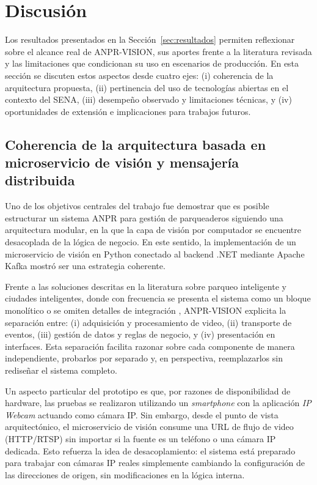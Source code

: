 \section{Discusión}
\label{sec:discusion}

Los resultados presentados en la Sección~\ref{sec:resultados} permiten reflexionar sobre el alcance real de ANPR-VISION, sus aportes frente a la literatura revisada y las limitaciones que condicionan su uso en escenarios de producción. En esta sección se discuten estos aspectos desde cuatro ejes: (i) coherencia de la arquitectura propuesta, (ii) pertinencia del uso de tecnologías abiertas en el contexto del SENA, (iii) desempeño observado y limitaciones técnicas, y (iv) oportunidades de extensión e implicaciones para trabajos futuros.

\subsection{Coherencia de la arquitectura basada en microservicio de visión y mensajería distribuida}

Uno de los objetivos centrales del trabajo fue demostrar que es posible estructurar un sistema ANPR para gestión de parqueaderos siguiendo una arquitectura modular, en la que la capa de visión por computador se encuentre desacoplada de la lógica de negocio. En este sentido, la implementación de un microservicio de visión en Python conectado al backend .NET mediante Apache Kafka mostró ser una estrategia coherente.

Frente a las soluciones descritas en la literatura sobre parqueo inteligente y ciudades inteligentes, donde con frecuencia se presenta el sistema como un bloque monolítico o se omiten detalles de integración \cite{streetsavvy_2024,campussense_2017,realtime_parking_two_cameras_2024}, ANPR-VISION explicita la separación entre: (i) adquisición y procesamiento de video, (ii) transporte de eventos, (iii) gestión de datos y reglas de negocio, y (iv) presentación en interfaces. Esta separación facilita razonar sobre cada componente de manera independiente, probarlos por separado y, en perspectiva, reemplazarlos sin rediseñar el sistema completo.

Un aspecto particular del prototipo es que, por razones de disponibilidad de hardware, las pruebas se realizaron utilizando un \textit{smartphone} con la aplicación \textit{IP Webcam} actuando como cámara IP. Sin embargo, desde el punto de vista arquitectónico, el microservicio de visión consume una URL de flujo de video (HTTP/RTSP) sin importar si la fuente es un teléfono o una cámara IP dedicada. Esto refuerza la idea de desacoplamiento: el sistema está preparado para trabajar con cámaras IP reales simplemente cambiando la configuración de las direcciones de origen, sin modificaciones en la lógica interna.

